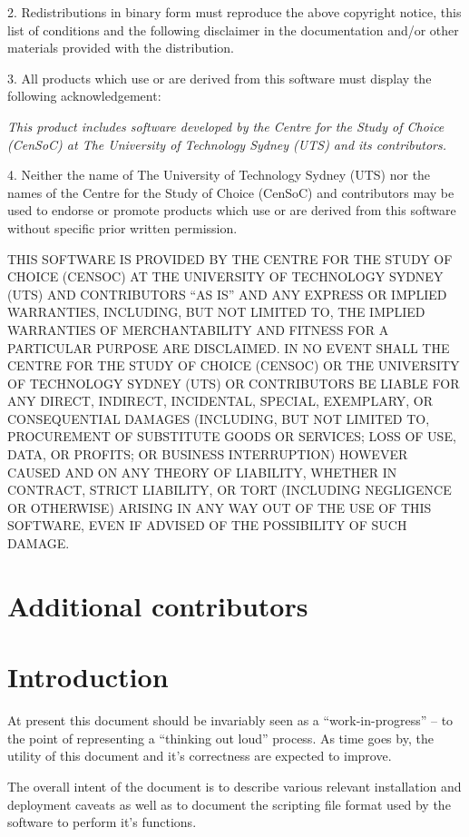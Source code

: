 \documentclass[12pt,a4paper]{article}
\begin{document}
2. Redistributions in binary form must reproduce the above copyright notice, this list of conditions and the following disclaimer in the documentation and/or other materials provided with the distribution.

3. All products which use or are derived from this software must display the following acknowledgement:

\textit{This product includes software developed by the Centre for the Study of Choice (CenSoC) at The University of Technology Sydney (UTS) and its contributors.}

4. Neither the name of The University of Technology Sydney (UTS) nor the names of the Centre for the Study of Choice (CenSoC) and contributors may be used to endorse or promote products which use or are derived from this software without specific prior written permission.

THIS SOFTWARE IS PROVIDED BY THE CENTRE FOR THE STUDY OF CHOICE (CENSOC) AT THE UNIVERSITY OF TECHNOLOGY SYDNEY (UTS) AND CONTRIBUTORS ``AS IS'' AND ANY EXPRESS OR IMPLIED WARRANTIES, INCLUDING, BUT NOT LIMITED TO, THE IMPLIED WARRANTIES OF MERCHANTABILITY AND FITNESS FOR A PARTICULAR PURPOSE ARE DISCLAIMED. IN NO EVENT SHALL THE CENTRE FOR THE STUDY OF CHOICE (CENSOC) OR THE UNIVERSITY OF TECHNOLOGY SYDNEY (UTS) OR CONTRIBUTORS BE LIABLE FOR ANY DIRECT, INDIRECT, INCIDENTAL, SPECIAL, EXEMPLARY, OR CONSEQUENTIAL DAMAGES (INCLUDING, BUT NOT LIMITED TO, PROCUREMENT OF SUBSTITUTE GOODS OR SERVICES; LOSS OF USE, DATA, OR PROFITS; OR BUSINESS INTERRUPTION) HOWEVER CAUSED AND ON ANY THEORY OF LIABILITY, WHETHER IN CONTRACT, STRICT LIABILITY, OR TORT (INCLUDING NEGLIGENCE OR OTHERWISE) ARISING IN ANY WAY OUT OF THE USE OF THIS SOFTWARE, EVEN IF ADVISED OF THE POSSIBILITY OF SUCH DAMAGE. 

\newpage
\section{Additional contributors}

\newpage
\section{Introduction}

At present this document should be invariably seen as a ``work-in-progress'' -- to the point of representing a ``thinking out loud'' process. As time goes by, the utility of this document and it's correctness are expected to improve.

The overall intent of the document is to describe various relevant installation and deployment caveats as well as to document the scripting file format used by the software to perform it's functions.
\end{document}
